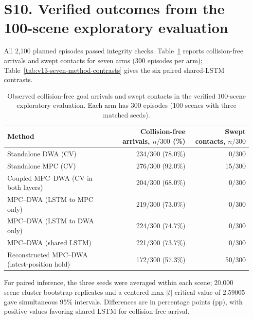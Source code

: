 \documentclass[10pt]{article}
\begin{document}
\section*{S10. Verified outcomes from the 100-scene exploratory evaluation}
All 2,100 planned episodes passed integrity checks. Table~\ref{tab:v13-seven-method-outcomes} reports collision-free arrivals and swept contacts for seven arms (300 episodes per arm); Table~\ref{tab:v13-seven-method-contrasts} gives the six paired shared-LSTM contrasts.

\begin{table}[H]
\centering
\caption{Observed collision-free goal arrivals and swept contacts in the verified 100-scene exploratory evaluation. Each arm has 300 episodes (100 scenes with three matched seeds).}
\label{tab:v13-seven-method-outcomes}
\footnotesize
\renewcommand{\arraystretch}{1.12}
\setlength{\tabcolsep}{4pt}
\begin{tabularx}{\linewidth}{@{}>{\raggedright\arraybackslash}Xrr@{}}
\toprule
Method & Collision-free arrivals, $n/300$ (\%) & Swept contacts, $n/300$ \\
\midrule
Standalone DWA (CV) & 234/300 (78.0\%) & 0/300 \\
Standalone MPC (CV) & 276/300 (92.0\%) & 15/300 \\
Coupled MPC--DWA (CV in both layers) & 204/300 (68.0\%) & 0/300 \\
MPC--DWA (LSTM to MPC only) & 219/300 (73.0\%) & 0/300 \\
MPC--DWA (LSTM to DWA only) & 224/300 (74.7\%) & 0/300 \\
MPC--DWA (shared LSTM) & 221/300 (73.7\%) & 0/300 \\
Reconstructed MPC--DWA (latest-position hold) & 172/300 (57.3\%) & 50/300 \\
\bottomrule
\end{tabularx}
\end{table}

For paired inference, the three seeds were averaged within each scene; 20,000 scene-cluster bootstrap replicates and a centered max-$|t|$ critical value of 2.59005 gave simultaneous 95\% intervals. Differences are in percentage points (pp), with positive values favoring shared LSTM for collision-free arrival.
\end{document}
